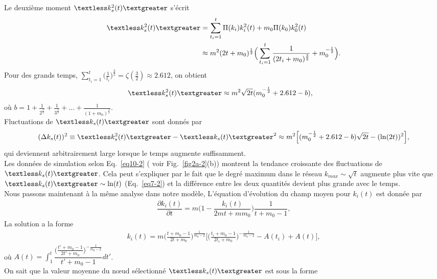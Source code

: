  Le deuxième moment $\kmss$ s'écrit
 \begin{align}
 \kmss&=\sum_{t_i=1}^t\Pi(k_i)k^2_i(t)+m_0\Pi(k_0)k_0^2(t)\label{eq8-2} \\
 &\approx m^2(2t+m_0)^{\frac{1}{2}} \Big(\sum_{t_i=1}^t \frac{1}{(2t_i+m_0)^{\frac{3}{2}}}+m_0^{-\frac{1}{2}}\Big).
 \end{align}
 Pour des grands temps, $\sum_{t_i=1}^t\Big(\frac{1}{t_i}\Big)^{\frac{3}{2}}=\zeta(\frac{3}{2}) \approx 2.612$, on obtient 
 \begin{eqnarray}
 \begin{split}
 \kmss&\approx m^2\sqrt{2t}(m_0^{-\frac{1}{2}}+2.612-b),
 \label{eq9-2}
 \end{split}
 \end{eqnarray}
où $b=1+\frac{1}{2^\frac{3}{2}}+\frac{1}{3^\frac{3}{2}}+\ldots+\frac{1}{(1+m_0)^\frac{3}{2}}$.\\
Fluctuations de $\kms$ sont donnés par
\begin{align}
(\Delta k_s(t))^2 \equiv \kmss-\kms^2\approx m^2 \Big[(m_0^{-\frac{1}{2}}+2.612-b)\sqrt{2t}-(\ln(2t))^2\Big],
\label{eq10-2}
\end{align}
qui deviennent arbitrairement large lorsque le temps augmente suffisamment. \\
Les données de simulation selon Eq.~\ref{eq10-2} ( voir Fig.~\ref{fig2a-2}(b)) montrent la tendance croissante des fluctuations de $\kms$.
Cela peut s'expliquer par le fait que le degré maximum dans le réseau $k_{max}\sim \sqrt{t}$ \cite{Cohen-Havlinl2010} augmente plus vite que $\kms\sim \ln(t)$ (Eq.~\ref{eq7-2}) et la différence entre les deux quantités devient plus grande avec le temps. \\
Nous passons maintenant à la même analyse dans notre modèle,  L'équation d'évolution du champ moyen pour $k_i(t)$ est donnée par
\begin{eqnarray}
\dfrac{\partial k_i(t)}{\partial t}=m\Big(1-\dfrac{k_i(t)}{2mt+mm_0}\Big)\dfrac{1}{t+m_0-1},
\end{eqnarray}
La solution a la forme
\begin{eqnarray}
k_i(t)=m \Big(\frac{t+m_0-1}{2t+m_0}\Big)^{\frac{1}{m_0-2}}\Bigg[\Big(\frac{t_i+m_0-1}{2t_i+m_0}\Big)^{-\frac{1}{m_0-2}}-A(t_i)
+A(t)\Bigg],
\label{kit}
\end{eqnarray}
où $A(t)=\displaystyle \int_1^{t}\dfrac{\Big(\frac{t'+m_0-1}{2t'+m_0}\Big)^{-\frac{1}{m_0-2}}}{t'+m_0-1}dt'$.\\
On sait que la valeur moyenne du nœud sélectionné $\kms$ est sous la forme 
